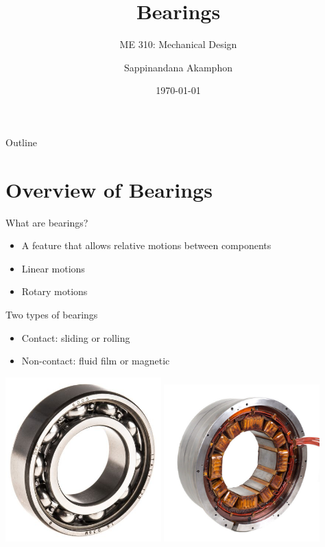 \documentclass[10pt, svgnames]{beamer}
\author{Sappinandana Akamphon}
\date{\today}
\title{Bearings}
\subtitle{ME 310: Mechanical Design}
\institute{Department of Mechanical Engineering, TSE}
\date{}
\begin{document}
\maketitle
\begin{frame}{Outline}
\tableofcontents
\end{frame}


\section{Overview of Bearings}
\label{sec:org9b43995}

\begin{frame}[label={sec:org0555bfa}]{What are bearings?}
\begin{itemize}
\item A feature that allows relative motions between components
\item Linear motions
\item Rotary motions
\end{itemize}
\end{frame}

\begin{frame}[label={sec:org1120274}]{Two types of bearings}
\begin{itemize}
\item Contact: sliding or rolling

\item Non-contact: fluid film or magnetic
\end{itemize}

\begin{center}
\includegraphics[width=0.45\textwidth]{./pictures/ball-bearing.jpg}
\includegraphics[width=0.45\textwidth]{./pictures/magnetic-bearing.jpg}
\end{center}
\end{frame}
\end{document}
